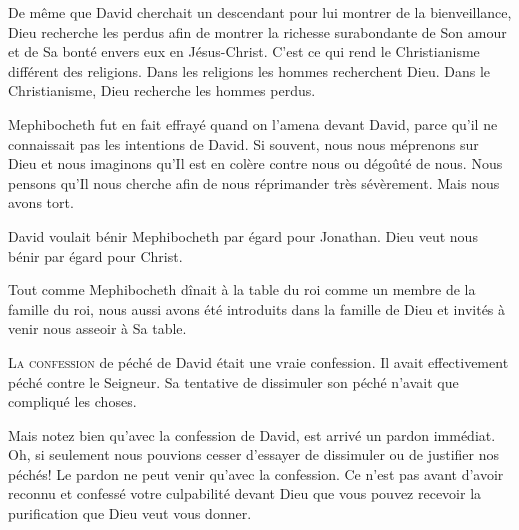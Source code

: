 De même que David cherchait un descendant pour lui montrer
 de la bienveillance, Dieu recherche les perdus afin de montrer
 la richesse surabondante de Son amour et de Sa bonté envers eux
 en Jésus-Christ. C'est ce qui rend le Christianisme différent des religions.
 Dans les religions les hommes recherchent Dieu.
 Dans le Christianisme, Dieu recherche les hommes perdus. 

Mephibocheth fut en fait effrayé quand on l'amena devant David,
 parce qu'il ne connaissait pas les intentions de David.
 Si souvent, nous nous méprenons sur Dieu et nous imaginons
 qu'Il est en colère contre nous ou dégoûté de nous.
 Nous pensons qu'Il nous cherche afin de nous réprimander très sévèrement.
 Mais nous avons tort. 

David voulait bénir Mephibocheth par égard pour Jonathan.
 Dieu veut nous bénir par égard pour Christ. 


Tout comme Mephibocheth dînait à la table du roi
 comme un membre de la famille du roi,
 nous aussi avons été introduits dans la famille de Dieu
 et invités à venir nous asseoir à Sa table. 

\dvrule






\lettrine{L}{a confession} de péché de David
 était une vraie confession.
 Il avait effectivement péché contre le Seigneur.
 Sa tentative de dissimuler son péché
 n'avait que compliqué les choses. 

Mais notez bien qu'avec la confession de David,
 est arrivé un pardon immédiat.
 Oh, si seulement nous pouvions cesser d'essayer de dissimuler
 ou de justifier nos péchés!
 Le pardon ne peut venir qu'avec la confession.
 Ce n'est pas avant d'avoir reconnu et confessé votre culpabilité
 devant Dieu que vous pouvez recevoir la purification
 que Dieu veut vous donner. 



